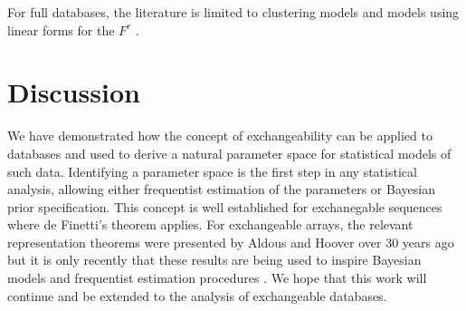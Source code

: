 For full databases, the literature is limited to clustering models \cite{Kemp2006} and models using linear forms for the $F^r$ \citep[e.g.][]{Acar, Acar2012, Acar2013, Andersen2013, Davison, Ermis1958, Gallinari2011, Jimeng2009, Kong2010, Lippert2008, Networks, Nickel2011, Shangguan2012, Singh, Singha, Singh2008}.

\section{Discussion}

We have demonstrated how the concept of exchangeability can be applied to databases and used to derive a natural parameter space for statistical models of such data.
Identifying a parameter space is the first step in any statistical analysis, allowing either frequentist estimation of the parameters or Bayesian prior specification.
This concept is well established for exchanegable sequences where de Finetti's theorem \citep[e.g.][]{Kallenberg2005} applies.
For exchangeable arrays, the relevant representation theorems were presented by Aldous and Hoover \cite{Aldous1981a, Hoover1979} over 30 years ago but it is only recently that these results are being used to inspire Bayesian models \cite{Hoff2007a, Roy2009, Lloyd2012} and frequentist estimation procedures \cite{Kallenberg1999a,Choi2012, Wolfe2013}.
We hope that this work will continue and be extended to the analysis of exchangeable databases.

\outbpdocument{


}
